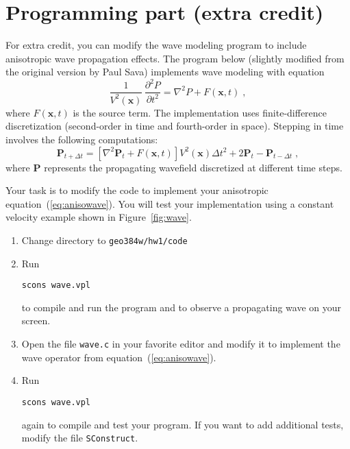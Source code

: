 \lstset{language=python,numbers=left,numberstyle=\tiny,showstringspaces=false}


\section{Programming part (extra credit)}

For extra credit, you can modify the wave modeling program to include
anisotropic wave propagation effects. The program below (slightly
modified from the original version by Paul Sava) implements wave
modeling with equation
\begin{equation}
   \label{eq:isowave2}
   {{\frac{1}{V^2(\mathbf{x})}}\,{\frac{\partial^2 P}{\partial t^2}}} =
   {\nabla^2 P} + {F(\mathbf{x},t)}\;,
\end{equation} 
where $F(\mathbf{x},t)$ is the source term. The implementation uses
finite-difference discretization (second-order in time and fourth-order in space). 
Stepping in time involves the following computations:
\begin{equation}
\mathbf{P}_{t+\Delta t} = \left[ \nabla^2 \mathbf{P}_t + F(\mathbf{x},t)\right] V^2(\mathbf{x}) \Delta t^2 + 2 \mathbf{P}_{t} - \mathbf{P}_{t-\Delta t} \;,
\label{eq:step}
\end{equation}
where $\mathbf{P}$ represents the propagating wavefield discretized at different time steps.

\lstset{language=c,numbers=left,numberstyle=\tiny,showstringspaces=false}


Your task is to modify the code to implement your anisotropic
equation~(\ref{eq:anisowave}). You will test your implementation using a constant velocity example shown in Figure~\ref{fig:wave}.


\begin{enumerate}
\item Change directory to \verb#geo384w/hw1/code#
\item Run
\begin{verbatim}
scons wave.vpl
\end{verbatim}
to compile and run the program and to observe a propagating wave on your screen.
\item Open the file \texttt{wave.c} in your favorite editor and modify it to implement the wave operator from equation~(\ref{eq:anisowave}).
\item Run
\begin{verbatim}
scons wave.vpl
\end{verbatim}
again to compile and test your program. If you want to add additional tests, modify the file \texttt{SConstruct}.
\end{enumerate}

